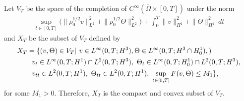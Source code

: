 \documentclass[12pt,a4paper]{amsart}
\numberwithin{equation}{section}
\theoremstyle{plain}
\theoremstyle{definition}
\begin{document}
\vspace{0.3cm}
Let $V_T$ be the space of the completion of $C^{\infty}(\overline{\Omega}\times[0,T])$ under the norm
\begin{equation}\label{def_VT}
\begin{aligned}
\sup\limits_{t\in[0,T]}\Big(\|\rho_{0}^{1/2}v\|_{L^{2}}^2+\|\rho_{0}^{1/2}\Theta\|_{L^{2}}^2\Big)+\int_{0}^{T}\|v\|_{H^1}^2 +\|\Theta\|_{H^1}^2\ dt
\end{aligned}
\end{equation}
and $X_T$ be the subset of $V_T$ defined by
\begin{equation}\label{def_XT}
\begin{aligned}
X_T&=\{ (v,\Theta)\in V_T\large|~ v\in L^{\infty}(0,T;H^3),\Theta\in L^{\infty}(0,T;H^3\cap H_0^1),)\\
& ~~v_t\in L^{\infty}(0,T;H^1)\cap L^2(0,T;H^3),~ \Theta_t\in L^{\infty}(0,T;H^1_0)\cap L^2(0,T;H^3),\\
&~~ v_{tt}\in L^2(0,T;H^1), ~\Theta_{tt}\in L^2(0,T;H^1),~\sup\limits_{t\in[0,T]}F(v,\Theta) \leq M_1\}, 
\end{aligned}
\end{equation}
for some $M_1>0$.
Therefore, $X_T$ is the compact and convex subset of $V_T$.
\end{document}
